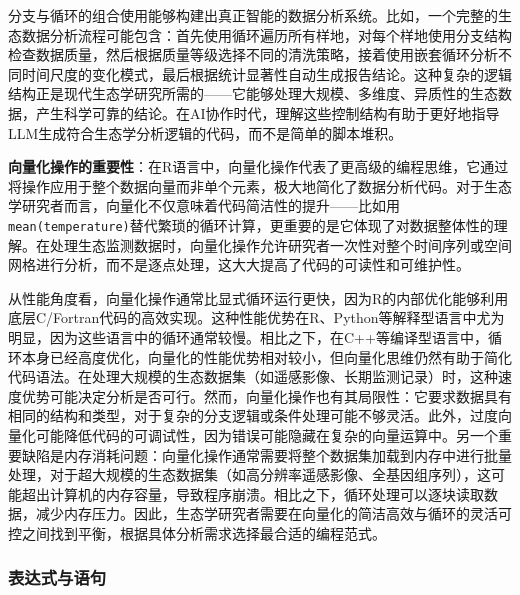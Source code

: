 \documentclass[
  twoside]{book}
\begin{document}
分支与循环的组合使用能够构建出真正智能的数据分析系统。比如，一个完整的生态数据分析流程可能包含：首先使用循环遍历所有样地，对每个样地使用分支结构检查数据质量，然后根据质量等级选择不同的清洗策略，接着使用嵌套循环分析不同时间尺度的变化模式，最后根据统计显著性自动生成报告结论。这种复杂的逻辑结构正是现代生态学研究所需的------它能够处理大规模、多维度、异质性的生态数据，产生科学可靠的结论。在AI协作时代，理解这些控制结构有助于更好地指导LLM生成符合生态学分析逻辑的代码，而不是简单的脚本堆积。

\textbf{向量化操作的重要性}：在R语言中，向量化操作代表了更高级的编程思维，它通过将操作应用于整个数据向量而非单个元素，极大地简化了数据分析代码。对于生态学研究者而言，向量化不仅意味着代码简洁性的提升------比如用\texttt{mean(temperature)}替代繁琐的循环计算，更重要的是它体现了对数据整体性的理解。在处理生态监测数据时，向量化操作允许研究者一次性对整个时间序列或空间网格进行分析，而不是逐点处理，这大大提高了代码的可读性和可维护性。

从性能角度看，向量化操作通常比显式循环运行更快，因为R的内部优化能够利用底层C/Fortran代码的高效实现。这种性能优势在R、Python等解释型语言中尤为明显，因为这些语言中的循环通常较慢。相比之下，在C++等编译型语言中，循环本身已经高度优化，向量化的性能优势相对较小，但向量化思维仍然有助于简化代码语法。在处理大规模的生态数据集（如遥感影像、长期监测记录）时，这种速度优势可能决定分析是否可行。然而，向量化操作也有其局限性：它要求数据具有相同的结构和类型，对于复杂的分支逻辑或条件处理可能不够灵活。此外，过度向量化可能降低代码的可调试性，因为错误可能隐藏在复杂的向量运算中。另一个重要缺陷是内存消耗问题：向量化操作通常需要将整个数据集加载到内存中进行批量处理，对于超大规模的生态数据集（如高分辨率遥感影像、全基因组序列），这可能超出计算机的内存容量，导致程序崩溃。相比之下，循环处理可以逐块读取数据，减少内存压力。因此，生态学研究者需要在向量化的简洁高效与循环的灵活可控之间找到平衡，根据具体分析需求选择最合适的编程范式。

\hypertarget{ux8868ux8fbeux5f0fux4e0eux8bedux53e5}{%
\subsubsection{表达式与语句}\label{ux8868ux8fbeux5f0fux4e0eux8bedux53e5}}
\end{document}

